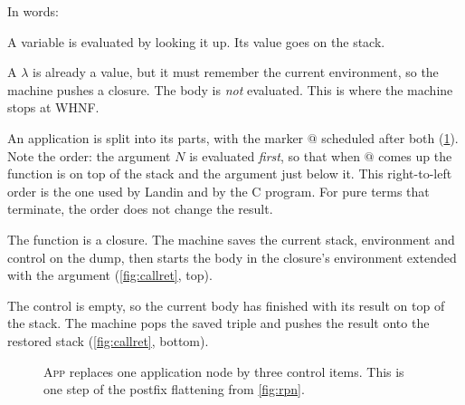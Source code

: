 \documentclass[11pt,a4paper]{article}
\makeatletter
\newcommand{\ap}{\mathtt{@}}
\newcommand{\rul}[1]{\textsc{#1}}
\theoremstyle{definition}
\theoremstyle{plain}
\makeatother
\begin{document}
In words:
\begin{description}[style=nextline, leftmargin=1.2em, itemsep=2pt]
\item[\rul{Var}] A variable is evaluated by looking it up. Its value goes on
  the stack.
\item[\rul{Abs}] A $\lambda$ is already a value, but it must remember the
  current environment, so the machine pushes a closure. The body is
  \emph{not} evaluated. This is where the machine stops at WHNF.
\item[\rul{App}] An application is split into its parts, with the marker $\ap$
  scheduled after both (\cref{fig:app}). Note the order: the argument $N$ is
  evaluated \emph{first}, so that when $\ap$ comes up the function is on top
  of the stack and the argument just below it. This right-to-left order is the
  one used by Landin and by the C program. For pure terms that terminate, the
  order does not change the result.
\item[\rul{Call}] The function is a closure. The machine saves the current
  stack, environment and control on the dump, then starts the body in the
  closure's environment extended with the argument (\cref{fig:callret}, top).
\item[\rul{Return}] The control is empty, so the current body has finished
  with its result on top of the stack. The machine pops the saved triple and
  pushes the result onto the restored stack (\cref{fig:callret}, bottom).
\end{description}

\begin{figure}[t]
\centering
{}
\caption{\rul{App} replaces one application node by three control items.
This is one step of the postfix flattening from \cref{fig:rpn}.}
\label{fig:app}
\end{figure}
\end{document}
